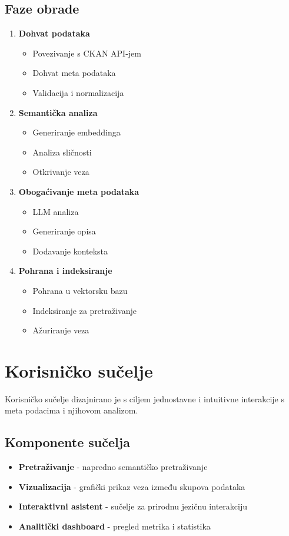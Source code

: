 \subsection{Faze obrade}
\begin{enumerate}
    \item \textbf{Dohvat podataka}
    \begin{itemize}
        \item Povezivanje s CKAN API-jem
        \item Dohvat meta podataka
        \item Validacija i normalizacija
    \end{itemize}
    
    \item \textbf{Semantička analiza}
    \begin{itemize}
        \item Generiranje embeddinga
        \item Analiza sličnosti
        \item Otkrivanje veza
    \end{itemize}
    
    \item \textbf{Obogaćivanje meta podataka}
    \begin{itemize}
        \item LLM analiza
        \item Generiranje opisa
        \item Dodavanje konteksta
    \end{itemize}
    
    \item \textbf{Pohrana i indeksiranje}
    \begin{itemize}
        \item Pohrana u vektorsku bazu
        \item Indeksiranje za pretraživanje
        \item Ažuriranje veza
    \end{itemize}
\end{enumerate}

\section{Korisničko sučelje}
\label{sec:user_interface}

Korisničko sučelje dizajnirano je s ciljem jednostavne i intuitivne interakcije s 
meta podacima i njihovom analizom.

\subsection{Komponente sučelja}
\begin{itemize}
    \item \textbf{Pretraživanje} - napredno semantičko pretraživanje
    \item \textbf{Vizualizacija} - grafički prikaz veza između skupova podataka
    \item \textbf{Interaktivni asistent} - sučelje za prirodnu jezičnu interakciju
    \item \textbf{Analitički dashboard} - pregled metrika i statistika
\end{itemize}

